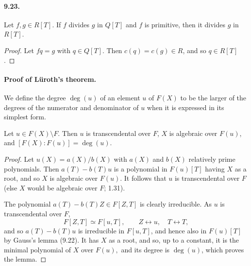 \paragraph{9.23.} Let $f,g\in R[T]$. If $f$ divides $g$ in $Q[T]$ and $f$ is primitive, then it divides $g$ in $R[T]$.
\begin{proof}
Let $fq=g$ with $q\in Q[T]$. Then $c(q)=c(g)\in R$, and so $q\in R[T]$.
\end{proof}

\paragraph{Proof of L\"uroth's theorem.}
We define the degree $\deg(u)$ of an element $u$ of $F(X)$ to be the larger of the degrees of the numerator and denominator of $u$ when it is expressed in its simplest form.
\begin{lemma}[9.24]
Let $u\in F(X)\setminus F$. Then $u$ is transcendental over $F$, $X$ is algebraic over $F(u)$, and $[F(X):F(u)]=\deg(u)$.
\end{lemma}
\begin{proof}
Let $u(X)=a(X)/b(X)$ with $a(X)$ and $b(X)$ relatively prime polynomials. Then $a(T)-b(T)u$ is a polynomial in $F(u)[T]$ having $X$ as a root, and so $X$ is algebraic over $F(u)$. It follows that $u$ is transcendental over $F$ (else $X$ would be algebraic over $F$; 1.31).

The polynomial $a(T)-b(T)Z\in F[Z,T]$ is clearly irreducible. As $u$ is transcendental over $F$,
\[
F[Z,T]\simeq F[u,T],\qquad Z\leftrightarrow u,\quad T\leftrightarrow T,
\]
and so $a(T)-b(T)u$ is irreducible in $F[u,T]$, and hence also in $F(u)[T]$ by Gauss's lemma (9.22). It has $X$ as a root, and so, up to a constant, it is the minimal polynomial of $X$ over $F(u),$ and its degree is $\deg(u)$, which proves the lemma.
\end{proof}

